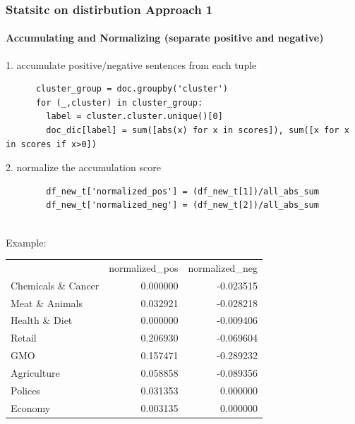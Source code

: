 \documentclass{tum-presentation}
\begin{document}
\begin{frame}[fragile]
  \frametitle{Statsitc on distirbution Approach 1  }
  \framesubtitle{Accumulating and Normalizing (separate positive and negative)}
  \begin{description}
    \large
    \item 1. accumulate positive$/$negative sentences from each tuple 
    \begin{lstlisting}
      cluster_group = doc.groupby('cluster')
      for (_,cluster) in cluster_group:
        label = cluster.cluster.unique()[0]
        doc_dic[label] = sum([abs(x) for x in scores]), sum([x for x in scores if x>0])
      \end{lstlisting}
      \item 2. normalize the accumulation score
    
      \begin{lstlisting}
        df_new_t['normalized_pos'] = (df_new_t[1])/all_abs_sum
        df_new_t['normalized_neg'] = (df_new_t[2])/all_abs_sum
  
    \end{lstlisting}
    \item Example:
    \small
    \begin{tabular}{lrr}
    
      {} &  normalized\_pos &  normalized\_neg \\
     
      Chemicals \& Cancer &        0.000000 &       -0.023515 \\
      Meat \& Animals     &        0.032921 &       -0.028218 \\
      Health \& Diet      &        0.000000 &       -0.009406 \\
      Retail             &        0.206930 &       -0.069604 \\
      GMO                &        0.157471 &       -0.289232 \\
      Agriculture        &        0.058858 &       -0.089356 \\
      Polices            &        0.031353 &        0.000000 \\
      Economy            &        0.003135 &        0.000000 \\
      
      \end{tabular}
  \end{description}
\end{frame}
\end{document}
